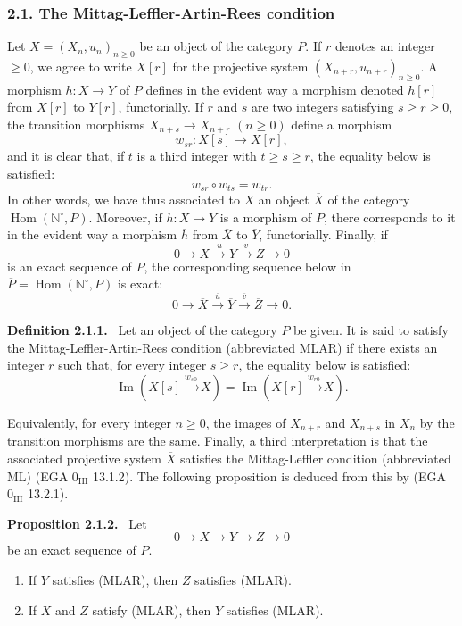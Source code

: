 \documentclass[11pt]{article}
\providecommand{\NN}{\mathbb{N}}
\newenvironment{statement}[1]{\par\medskip\noindent\textbf{#1.}\ }{\par\medskip}
\DeclareMathOperator{\Hom}{Hom}
\providecommand{\Hom}{\operatorname{Hom}}
\providecommand{\NN}{\mathbb N}
\providecommand{\Im}{\operatorname{Im}}
\renewcommand{\Im}{\operatorname{Im}}
\providecommand{\Im}{\operatorname{Im}}
\begin{document}
\subsubsection*{2.1. The Mittag-Leffler-Artin-Rees condition}
Let $X=(X_n,u_n)_{n\ge0}$ be an object of the category $P$. If $r$ denotes an integer $\ge0$, we agree to write $X[r]$ for the projective system $(X_{n+r},u_{n+r})_{n\ge0}$. A morphism $h:X\to Y$ of $P$ defines in the evident way a morphism denoted $h[r]$ from $X[r]$ to $Y[r]$, functorially. If $r$ and $s$ are two integers satisfying $s\ge r\ge0$, the transition morphisms $X_{n+s}\to X_{n+r}$ $(n\ge0)$ define a morphism
\[
w_{sr}:X[s]\longrightarrow X[r],
\]
and it is clear that, if $t$ is a third integer with $t\ge s\ge r$, the equality below is satisfied:
\[
w_{sr}\circ w_{ts}=w_{tr}.
\]
In other words, we have thus associated to $X$ an object $\overline X$ of the category $\Hom(\NN^\circ,P)$. Moreover, if $h:X\to Y$ is a morphism of $P$, there corresponds to it in the evident way a morphism $\overline h$ from $\overline X$ to $\overline Y$, functorially. Finally, if
\[
0\longrightarrow X\stackrel{u}{\longrightarrow}Y\stackrel{v}{\longrightarrow}Z\longrightarrow0
\]
is an exact sequence of $P$, the corresponding sequence below in $\overline P=\Hom(\NN^\circ,P)$ is exact:
\[
0\longrightarrow\overline X\stackrel{\overline u}{\longrightarrow}\overline Y\stackrel{\overline v}{\longrightarrow}\overline Z\longrightarrow0.
\]

\begin{statement}{Definition 2.1.1}
Let an object of the category $P$ be given. It is said to satisfy the Mittag-Leffler-Artin-Rees condition (abbreviated MLAR) if there exists an integer $r$ such that, for every integer $s\ge r$, the equality below is satisfied:
\[
\Im(X[s]\xrightarrow{w_{s0}}X)=\Im(X[r]\xrightarrow{w_{r0}}X).
\]
\end{statement}
Equivalently, for every integer $n\ge0$, the images of $X_{n+r}$ and $X_{n+s}$ in $X_n$ by the transition morphisms are the same. Finally, a third interpretation is that the associated projective system $\overline X$ satisfies the Mittag-Leffler condition (abbreviated ML) (EGA $0_{\mathrm{III}}$ 13.1.2). The following proposition is deduced from this by (EGA $0_{\mathrm{III}}$ 13.2.1).

\begin{statement}{Proposition 2.1.2}
Let
\[
0\longrightarrow X\longrightarrow Y\longrightarrow Z\longrightarrow0
\]
be an exact sequence of $P$.
\begin{enumerate}[label=(\roman*)]
\item If $Y$ satisfies (MLAR), then $Z$ satisfies (MLAR).
\item If $X$ and $Z$ satisfy (MLAR), then $Y$ satisfies (MLAR).
\end{enumerate}
\end{statement}
\end{document}
